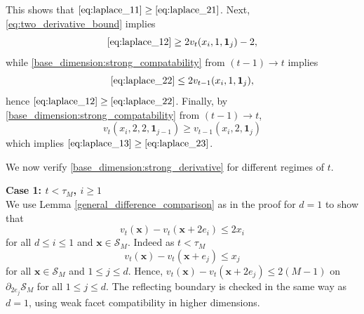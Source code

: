 \documentclass[12pt]{amsart}
\begin{document}
	This shows that $\eqref{eq:laplace_11} \geq \eqref{eq:laplace_21}$.
  	Next, \eqref{eq:two_derivative_bound} implies 
  \[
  \eqref{eq:laplace_12} \geq 2 v_t(x_i, 1, \mathbf{1}_j) - 2,
  \]
  while \eqref{base_dimension:strong_compatability} from $(t-1) \to t$ 
  implies 
    \[
  \eqref{eq:laplace_22} \leq 2 v_{t-1}(x_i, 1, \mathbf{1}_j),
  \]
  hence $\eqref{eq:laplace_12} \geq \eqref{eq:laplace_22}$.
  Finally, by \eqref{base_dimension:strong_compatability} from $(t-1) \to t$, 
  \[
  v_t(x_i,2,2,\mathbf{1}_{j-1}) \geq v_{t-1}(x_i,2,\mathbf{1}_j)
  \]
  which implies $\eqref{eq:laplace_13} \geq \eqref{eq:laplace_23}$.
  


	We now verify \eqref{base_dimension:strong_derivative} for different
	regimes of $t$. 





{\bf Case 1: $t < \tau_M$, $i \geq 1$} \\
We use Lemma \ref{general_difference_comparison} as in the proof for $d=1$
to show that 
\[
v_t(\mathbf{x}) - v_t(\mathbf{x} + 2 e_i) \leq 2 x_i
\]
for all $d \leq i \leq 1$ and $\mathbf{x} \in \mathcal{S}_M$.  Indeed as $t < \tau_M$
\begin{equation} \label{eq:derivative_bound}
v_{t}(\mathbf{x}) - v_{t}(\mathbf{x} + e_j) \leq x_j
\end{equation}
for all $\mathbf{x} \in \mathcal{S}_M$ and $1 \leq j \leq d$. Hence, 
$v_t(\mathbf{x}) - v_t(\mathbf{x} + 2 e_j) \leq 2 (M-1)$ on $\partial_{2 e_j} \mathcal{S}_M$ for all $1 \leq j \leq d$.
The reflecting boundary is checked in the same way as $d=1$, using weak facet compatibility in higher dimensions.
\end{document}
